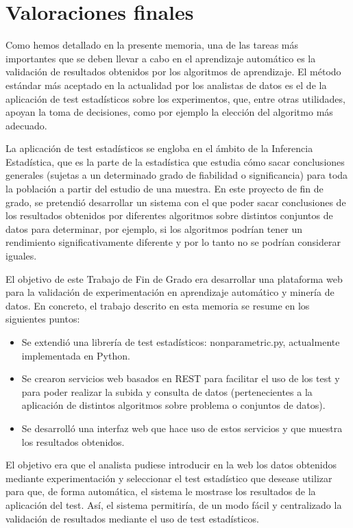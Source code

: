 \chapter{Valoraciones finales}
Como hemos detallado en la presente memoria, una de las tareas más importantes que se deben llevar a cabo en el aprendizaje automático es la validación de resultados obtenidos por los algoritmos de aprendizaje. El método estándar más aceptado en la actualidad por los analistas de datos es el de la aplicación de test estadísticos sobre los experimentos, que, entre otras utilidades, apoyan la toma de decisiones, como por ejemplo la elección del algoritmo más adecuado.

La aplicación de test estadísticos se engloba en el ámbito de la Inferencia Estadística, que es la parte de la estadística que estudia cómo sacar conclusiones generales (sujetas a un determinado grado de fiabilidad o significancia) para toda la población a partir del estudio de una muestra. En este proyecto de fin de grado, se pretendió desarrollar un sistema con el que poder sacar conclusiones de los resultados obtenidos por diferentes algoritmos sobre distintos conjuntos de datos para determinar, por ejemplo, si los algoritmos podrían tener un rendimiento significativamente diferente y por lo tanto no se podrían considerar iguales.

El objetivo de este Trabajo de Fin de Grado era desarrollar una plataforma web para la validación de experimentación en aprendizaje automático y minería de datos. En concreto, el trabajo descrito en esta memoria se resume en los siguientes puntos:

\begin{itemize}
\item Se extendió una librería de test estadísticos: nonparametric.py, actualmente implementada en Python.
\item Se crearon servicios web basados en REST para facilitar el uso de los test y para poder realizar la subida y consulta de datos (pertenecientes a la aplicación de distintos algoritmos sobre problema o conjuntos de datos).
\item Se desarrolló una interfaz web que hace uso de estos servicios y que muestra los resultados obtenidos.
\end{itemize}

El objetivo era que el analista pudiese introducir en la web los datos obtenidos mediante experimentación y seleccionar el test estadístico que desease utilizar para que, de forma automática, el sistema le mostrase los resultados de la aplicación del test. Así, el sistema permitiría, de un modo fácil y centralizado la validación de resultados mediante el uso de test estadísticos.

